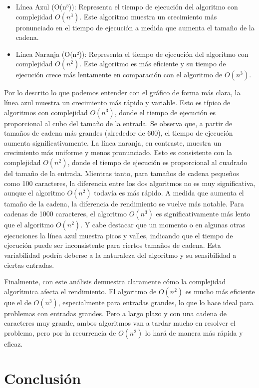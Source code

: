 \documentclass{report}
\begin{document}
\begin{itemize}
    \item Línea Azul (O(n³)): Representa el tiempo de ejecución del algoritmo con complejidad \(O(n^3)\). Este algoritmo muestra un crecimiento más pronunciado en el tiempo de ejecución a medida que aumenta el tamaño de la cadena.
    \item Línea Naranja (O(n²)): Representa el tiempo de ejecución del algoritmo con complejidad \(O(n^2)\). Este algoritmo es más eficiente y su tiempo de ejecución crece más lentamente en comparación con el algoritmo de \(O(n^3)\).
\end{itemize}

Por lo descrito lo que podemos entender con el gráfico de forma más clara, la línea azul muestra un crecimiento más rápido y variable. Esto es típico de algoritmos con complejidad \(O(n^3)\), donde el tiempo de ejecución es proporcional al cubo del tamaño de la entrada. Se observa que, a partir de tamaños de cadena más grandes (alrededor de 600), el tiempo de ejecución aumenta significativamente.
La línea naranja, en contraste, muestra un crecimiento más uniforme y menos pronunciado. Esto es consistente con la complejidad \(O(n^2)\), donde el tiempo de ejecución es proporcional al cuadrado del tamaño de la entrada.
\newpage
Mientras tanto, para tamaños de cadena pequeños como 100 caracteres, la diferencia entre los dos algoritmos no es muy significativa, aunque el algoritmo \(O(n^2)\) todavía es más rápido.
A medida que aumenta el tamaño de la cadena, la diferencia de rendimiento se vuelve más notable. Para cadenas de 1000 caracteres, el algoritmo \(O(n^3)\) es significativamente más lento que el algoritmo \(O(n^2)\).
Y cabe destacar que un momento o en algunas otras ejecuciones la línea azul muestra picos y valles, indicando que el tiempo de ejecución puede ser inconsistente para ciertos tamaños de cadena. Esta variabilidad podría deberse a la naturaleza del algoritmo y su sensibilidad a ciertas entradas.

Finalmente, con este análisis  demuestra claramente cómo la complejidad algorítmica afecta el rendimiento. El algoritmo de \(O(n^2)\) es mucho más eficiente que el de \(O(n^3)\), especialmente para entradas grandes, lo que lo hace ideal para problemas con entradas grandes. Pero a largo plazo y con una cadena de caracteres muy grande, ambos algoritmos van a tardar mucho en resolver el problema, pero por la recurrencia de \(O(n^2)\) lo hará de manera más rápida y eficaz.


\section{Conclusión}
\end{document}
